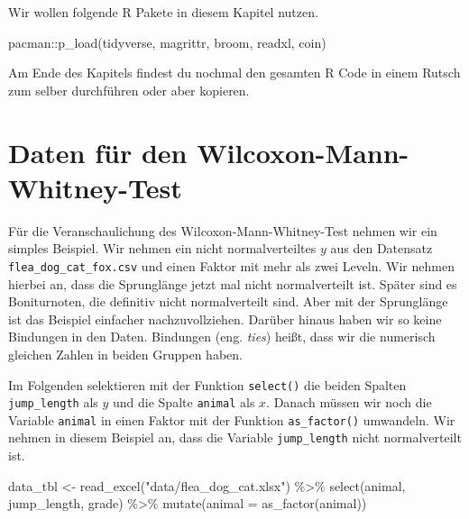 \documentclass[
  letterpaper,
]{scrbook}
\newenvironment{Shaded}{\begin{snugshade}}{\end{snugshade}}
\newcommand{\AttributeTok}[1]{\textcolor[rgb]{0.40,0.45,0.13}{#1}}
\newcommand{\FunctionTok}[1]{\textcolor[rgb]{0.28,0.35,0.67}{#1}}
\newcommand{\NormalTok}[1]{\textcolor[rgb]{0.00,0.23,0.31}{#1}}
\newcommand{\OtherTok}[1]{\textcolor[rgb]{0.00,0.23,0.31}{#1}}
\newcommand{\SpecialCharTok}[1]{\textcolor[rgb]{0.37,0.37,0.37}{#1}}
\newcommand{\StringTok}[1]{\textcolor[rgb]{0.13,0.47,0.30}{#1}}
\begin{document}
Wir wollen folgende R Pakete in diesem Kapitel nutzen.

\begin{Shaded}
\begin{Highlighting}[]
\NormalTok{pacman}\SpecialCharTok{::}\FunctionTok{p\_load}\NormalTok{(tidyverse, magrittr, broom, }
\NormalTok{               readxl, coin)}
\end{Highlighting}
\end{Shaded}

Am Ende des Kapitels findest du nochmal den gesamten R Code in einem
Rutsch zum selber durchführen oder aber kopieren.

\hypertarget{daten-fuxfcr-den-wilcoxon-mann-whitney-test}{%
\section{Daten für den
Wilcoxon-Mann-Whitney-Test}\label{daten-fuxfcr-den-wilcoxon-mann-whitney-test}}

{}

Für die Veranschaulichung des Wilcoxon-Mann-Whitney-Test nehmen wir ein
simples Beispiel. Wir nehmen ein nicht normalverteiltes \(y\) aus den
Datensatz \texttt{flea\_dog\_cat\_fox.csv} und einen Faktor mit mehr als
zwei Leveln. Wir nehmen hierbei an, dass die Sprunglänge jetzt mal nicht
normalverteilt ist. Später sind es Boniturnoten, die definitiv nicht
normalverteilt sind. Aber mit der Sprunglänge ist das Beispiel einfacher
nachzuvollziehen. Darüber hinaus haben wir so keine Bindungen in den
Daten. Bindungen (eng. \emph{ties}) heißt, dass wir die numerisch
gleichen Zahlen in beiden Gruppen haben.

Im Folgenden selektieren mit der Funktion \texttt{select()} die beiden
Spalten \texttt{jump\_length} als \(y\) und die Spalte \texttt{animal}
als \(x\). Danach müssen wir noch die Variable \texttt{animal} in einen
Faktor mit der Funktion \texttt{as\_factor()} umwandeln. Wir nehmen in
diesem Beispiel an, dass die Variable \texttt{jump\_length} nicht
normalverteilt ist.

\begin{Shaded}
\begin{Highlighting}[]
\NormalTok{data\_tbl }\OtherTok{\textless{}{-}} \FunctionTok{read\_excel}\NormalTok{(}\StringTok{"data/flea\_dog\_cat.xlsx"}\NormalTok{) }\SpecialCharTok{\%\textgreater{}\%} 
  \FunctionTok{select}\NormalTok{(animal, jump\_length, grade) }\SpecialCharTok{\%\textgreater{}\%} 
  \FunctionTok{mutate}\NormalTok{(}\AttributeTok{animal =} \FunctionTok{as\_factor}\NormalTok{(animal))}
\end{Highlighting}
\end{Shaded}
\end{document}
